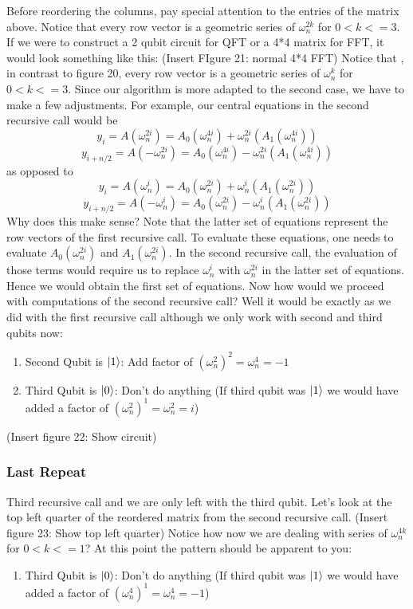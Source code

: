 \documentclass{article}
\newcommand{\om}{\omega_n}
\begin{document}
    Before reordering the columns, pay special attention to the entries of
    the matrix above. Notice that every row vector is a geometric series
    of \(\om^{2k}\) for \(0<k<=3\). If we were to construct a 2 qubit
    circuit for QFT or a 4*4 matrix for FFT, it would look something like
    this:
    (Insert FIgure 21: normal 4*4 FFT)
    Notice that , in contrast to figure 20, every row vector is a geometric
    series of \(\om^{k}\) for \(0<k<=3\). Since our algorithm is more adapted
    to the second case, we have to make a few adjustments. For example,
    our central equations in the second recursive call would be
    \[ y_{i} = A(\om^{2i}) = A_0(\om^{4i}) +\om^{2i}(A_1(\om^{4i})) \]
    \[ y_{i+n/2}= A(-\om^{2i}) = A_0(\om^{4i}) -\om^{2i}(A_1(\om^{4i})) \]
    as opposed to
    \[ y_{i} = A(\om^{i}) = A_0(\om^{2i}) +\om^i(A_1(\om^{2i})) \]
    \[ y_{i+n/2}= A(-\om^{i}) = A_0(\om^{2i}) -\om^i(A_1(\om^{2i})) \]
    Why does this make sense? Note that the latter set of equations represent
    the row vectors of the first recursive call. To evaluate these equations,
    one needs to evaluate \(A_0(\om^{2i})\) and \(A_1(\om^{2i})\).
    In the second recursive call, the evaluation of those terms would require
    us to replace \(\om^{i}\) with \(\om^{2i}\) in the latter set of equations.
    Hence we would obtain the first set of equations.
    Now how would we proceed with computations of the second recursive call?
    Well it would be exactly as we did with the first recursive call although
    we only work with second and third qubits now:
    \begin{enumerate}
      \item Second Qubit is \(\ket{1}\): Add factor of \((\om^2)^2 = \om^4 = -1\)
      \item Third Qubit is \(\ket{0}\): Don't do anything (If third qubit
      was \(\ket{1}\) we would have added a factor of \((\om^2)^1 = \om^2 = i\))
    \end{enumerate}
    (Insert figure 22: Show circuit)
    \subsubsection{Last Repeat}
    Third recursive call and we are only left with the third qubit. Let's look
    at the top left quarter of the reordered matrix from the second recursive
    call.
    (Insert figure 23: Show top left quarter)
    Notice how now we are dealing with series of \(\om^{4k}\) for \(0<k<=1\)?
    At this point the pattern should be apparent to you:
    \begin{enumerate}
      \item Third Qubit is \(\ket{0}\): Don't do anything (If third qubit
      was \(\ket{1}\) we would have added a factor of \((\om^4)^1 = \om^4 = -1\))
    \end{enumerate}
\end{document}
